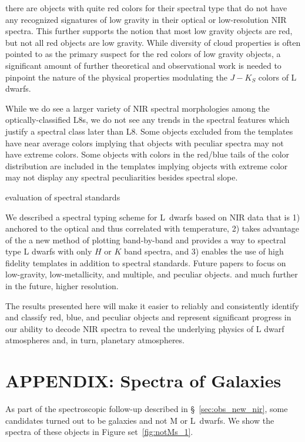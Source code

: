 \documentclass[12pt,preprint]{aastex}
\begin{document}
there are objects with quite red colors for their spectral type that do not have any recognized signatures of low gravity in their optical or low-resolution NIR spectra.
This further supports the notion that most low gravity objects are red, but not all red objects are low gravity.
While diversity of cloud properties is often pointed to as the primary suspect for the red colors of low gravity objects, a significant amount of further theoretical and observational work is needed to pinpoint the nature of the physical properties modulating the $J-K_S$ colors of L dwarfs.

While we do see a larger variety of NIR spectral morphologies among the optically-classified L8s, we do not see any trends in the spectral features which justify a spectral class later than L8.
Some objects excluded from the templates have near average colors implying that objects with peculiar spectra may not have extreme colors. 
Some objects with colors in the red/blue tails of the color distribution are included in the templates implying objects with extreme color may not display any spectral peculiarities besides spectral slope.

evaluation of spectral standards

We described a spectral typing scheme for L~dwarfs based on NIR data that is 1) anchored to the optical and thus correlated with temperature, 2) takes advantage of the a new method of plotting band-by-band and provides a way to spectral type L dwarfs with only $H$ or $K$ band spectra, and 3) enables the use of high fidelity templates in addition to spectral standards.
Future papers to focus on low-gravity, low-metallicity, and multiple, and peculiar objects. and much further in the future, higher resolution.

The results presented here will make it easier to reliably and consistently identify and classify red, blue, and peculiar objects and represent significant progress in our ability to decode NIR spectra to reveal the underlying physics of L dwarf atmospheres and, in turn, planetary atmospheres.

\appendix
\section{APPENDIX: Spectra of Galaxies}
\label{sec:galaxies}
As part of the spectroscopic follow-up described in \S~\ref{sec:obs_new_nir}, some candidates turned out to be galaxies and not M or L~dwarfs. We show the spectra of these objects in Figure set~\ref{fig:notMs_1}.
\end{document}
